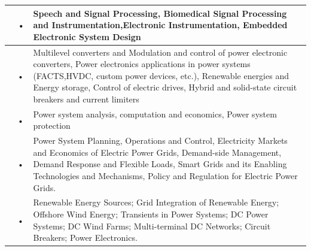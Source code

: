 \documentclass[openany]{book} %
\begin{document}
\begin{tabular}{p{3.5cm} p{3.5cm}p{9cm}}
\hline 
\href{https://www.ee.iitb.ac.in/~pcpandey/}{\color{blue}{Prof. Prem C. Pandey}} & • & Speech and Signal Processing, Biomedical Signal Processing and Instrumentation,Electronic Instrumentation, Embedded Electronic System Design \\ 
\hline 
\href{https://www.ee.iitb.ac.in/wiki/faculty/ashukla}{\color{blue}{Prof. Anshuman Shukla }}& • & Multilevel converters and Modulation and control of power electronic converters, Power electronics applications in power systems (FACTS,HVDC, custom power devices, etc.), Renewable energies and Energy storage, Control of electric drives, Hybrid and solid-state circuit breakers and current limiters \\ \hline 
\href{https://www.ee.iitb.ac.in/wiki/faculty/soman}{\color{blue}{Prof. Shreevardhan A. Soman}} & • & Power system analysis, computation and economics, Power system protection \\ 
\hline 
\href{https://www.ee.iitb.ac.in/web/faculty/homepage/anu}{\color{blue}{Prof. Anupama Kowli }} & • & Power System Planning, Operations and Control, Electricity Markets and Economics of Electric Power Grids, Demand-side Management, Demand
Response and Flexible Loads, Smart Grids and its Enabling Technologies and Mechanisms, Policy and Regulation for Electric Power Grids. \\ 
\hline 
\href{https://www.ee.iitb.ac.in/web/faculty/homepage/hjbahirat}{\color{blue}{Prof. Himanshu J. Bahirat }}& • & Renewable Energy Sources; Grid Integration of Renewable Energy; Offshore Wind Energy; Transients in Power Systems; DC Power Systems;
DC Wind Farms; Multi-terminal DC Networks; Circuit Breakers; Power Electronics. \\ 
\hline 
\end{tabular} 
\end{document}
